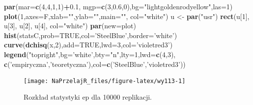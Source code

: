 \documentclass[polish,]{book}
\newenvironment{Shaded}{\begin{snugshade}}{\end{snugshade}}
\newcommand{\DataTypeTok}[1]{\textcolor[rgb]{0.13,0.29,0.53}{#1}}
\newcommand{\DecValTok}[1]{\textcolor[rgb]{0.00,0.00,0.81}{#1}}
\newcommand{\FloatTok}[1]{\textcolor[rgb]{0.00,0.00,0.81}{#1}}
\newcommand{\KeywordTok}[1]{\textcolor[rgb]{0.13,0.29,0.53}{\textbf{#1}}}
\newcommand{\NormalTok}[1]{#1}
\newcommand{\OperatorTok}[1]{\textcolor[rgb]{0.81,0.36,0.00}{\textbf{#1}}}
\newcommand{\OtherTok}[1]{\textcolor[rgb]{0.56,0.35,0.01}{#1}}
\newcommand{\StringTok}[1]{\textcolor[rgb]{0.31,0.60,0.02}{#1}}
\begin{document}
\begin{Shaded}
\begin{Highlighting}[]
\KeywordTok{par}\NormalTok{(}\DataTypeTok{mar=}\KeywordTok{c}\NormalTok{(}\DecValTok{4}\NormalTok{,}\DecValTok{4}\NormalTok{,}\DecValTok{1}\NormalTok{,}\DecValTok{1}\NormalTok{)}\OperatorTok{+}\FloatTok{0.1}\NormalTok{, }\DataTypeTok{mgp=}\KeywordTok{c}\NormalTok{(}\DecValTok{3}\NormalTok{,}\FloatTok{0.6}\NormalTok{,}\DecValTok{0}\NormalTok{),}\DataTypeTok{bg=}\StringTok{"lightgoldenrodyellow"}\NormalTok{,}\DataTypeTok{las=}\DecValTok{1}\NormalTok{)}
\KeywordTok{plot}\NormalTok{(}\DecValTok{1}\NormalTok{,}\DataTypeTok{axes=}\NormalTok{F,}\DataTypeTok{xlab=}\StringTok{""}\NormalTok{,}\DataTypeTok{ylab=}\StringTok{""}\NormalTok{,}\DataTypeTok{main=}\StringTok{""}\NormalTok{, }\DataTypeTok{col=}\StringTok{"white"}\NormalTok{)}
\NormalTok{u <-}\StringTok{ }\KeywordTok{par}\NormalTok{(}\StringTok{"usr"}\NormalTok{)}
\KeywordTok{rect}\NormalTok{(u[}\DecValTok{1}\NormalTok{], u[}\DecValTok{3}\NormalTok{], u[}\DecValTok{2}\NormalTok{], u[}\DecValTok{4}\NormalTok{], }\DataTypeTok{col=}\StringTok{"white"}\NormalTok{)}
\KeywordTok{par}\NormalTok{(}\DataTypeTok{new=}\NormalTok{plot)}
\KeywordTok{hist}\NormalTok{(statsC,}\DataTypeTok{prob=}\OtherTok{TRUE}\NormalTok{,}\DataTypeTok{col=}\StringTok{'SteelBlue'}\NormalTok{,}\DataTypeTok{border=}\StringTok{'white'}\NormalTok{)}
\KeywordTok{curve}\NormalTok{(}\KeywordTok{dchisq}\NormalTok{(x,}\DecValTok{2}\NormalTok{),}\DataTypeTok{add=}\OtherTok{TRUE}\NormalTok{,}\DataTypeTok{lwd=}\DecValTok{3}\NormalTok{,}\DataTypeTok{col=}\StringTok{'violetred3'}\NormalTok{)}
\KeywordTok{legend}\NormalTok{(}\StringTok{"topright"}\NormalTok{,}\DataTypeTok{bg=}\StringTok{'white'}\NormalTok{,}\DataTypeTok{bty=}\StringTok{"n"}\NormalTok{,}\DataTypeTok{lty=}\DecValTok{1}\NormalTok{,}\DataTypeTok{lwd=}\KeywordTok{c}\NormalTok{(}\DecValTok{4}\NormalTok{,}\DecValTok{3}\NormalTok{),}
       \KeywordTok{c}\NormalTok{(}\StringTok{'empiryczna'}\NormalTok{,}\StringTok{'teoretyczna'}\NormalTok{),}\DataTypeTok{col=}\KeywordTok{c}\NormalTok{(}\StringTok{'SteelBlue'}\NormalTok{,}\StringTok{'violetred3'}\NormalTok{))}
\end{Highlighting}
\end{Shaded}

\begin{figure}[h]

{\centering \texttt{[image: NaPrzelajR\_files/figure-latex/wy113-1]} 

}

\caption{Rozkład statystyki ep dla 10000 replikacji.}\label{fig:wy113}
\end{figure}
\end{document}
